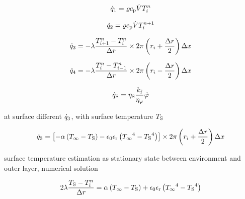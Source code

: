\documentclass{scrartcl}
\begin{document}
    \begin{equation}
        {\dot{q}}_1 = {\varrho} {c_\mathrm{p}} {\dot{V}} {T}_{{i}}^{{n}}
        \label{eq:heat_flow_1}
    \end{equation}

    \begin{equation}
        {\dot{q}}_2 = {\varrho} {c_\mathrm{p}} {\dot{V}} {T}_{{i}}^{{n}+1}
        \label{eq:heat_flow_2}
    \end{equation}

    \begin{equation}
        {\dot{q}}_3 = -{\lambda} \frac{{T}_{{i}+1}^{{n}}-{T}_{{i}}^{{n}}}{{\Delta r}} \times 2 \pi \left( {r}_{i} + \frac{{\Delta r}}{2} \right) {\Delta x}
        \label{eq:heat_flow_3}
    \end{equation}

    \begin{equation}
        {\dot{q}}_4 = -{\lambda} \frac{{T}_{{i}}^{{n}}-{T}_{{i}-1}^{{n}}}{{\Delta r}} \times 2 \pi \left( {r}_{i} - \frac{{\Delta r}}{2} \right) {\Delta x}
        \label{eq:heat_flow_4}
    \end{equation}

    \begin{equation}
        {\dot{q}_\mathrm{S}} = {\eta_\mathrm{S}} \frac{{k_\mathrm{f}}}{{\eta_\varphi}} {\dot{\varphi}}
        \label{eq:heat_source}
    \end{equation}

    at surface different ${\dot{q}}_3$, with surface temperature ${T_\mathrm{S}}$

    \begin{equation}
        {\dot{q}}_3 = \left[ -{\alpha} \left( {T_\infty} - {T_\mathrm{S}} \right) - {\epsilon_0}{\epsilon_\mathrm{r}}\left( {T_\infty}^4 - {T_\mathrm{S}}^4 \right) \right]
        \times 2 \pi \left( {r}_{i} + \frac{{\Delta r}}{2} \right) {\Delta x}
        \label{eq:heat_flow_3_surface}
    \end{equation}

    surface temperature estimation as stationary state between environment and outer layer, numerical solution

    \begin{equation}
        2 {\lambda} \frac{{T_\mathrm{S}} - {T}_{\hat{\imath}}^{n}}{{\Delta r}} = {\alpha} \left( {T_\infty} - {T_\mathrm{S}} \right) + {\epsilon_0}{\epsilon_\mathrm{r}}\left( {T_\infty}^4 - {T_\mathrm{S}}^4 \right)
        \label{eq:surface_temperature}
    \end{equation}
\end{document}
